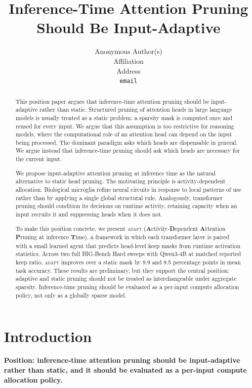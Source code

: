 \documentclass{article}
\title{Inference-Time Attention Pruning Should Be Input-Adaptive}
\author{%
  Anonymous Author(s) \\
  Affiliation \\
  Address \\
  \texttt{email} \\
}
\newcommand{\method}{\textsc{adapt}}
\begin{document}
\maketitle

\begin{abstract}
This position paper argues that inference-time attention pruning should be
input-adaptive rather than static.
Structured pruning of attention heads in large language models is usually
treated as a static problem: a sparsity mask is computed once and reused for
every input. We argue that this assumption is too restrictive for reasoning
models, where the computational role of an attention head can depend on the
input being processed. The dominant paradigm asks which heads are dispensable
in general. We argue instead that inference-time pruning should ask which heads
are necessary for the current input.

We propose input-adaptive attention pruning at inference time as the natural
alternative to static head pruning. The motivating principle is
activity-dependent allocation. Biological microglia refine neural circuits in
response to local patterns of use rather than by applying a single global
structural rule. Analogously, transformer pruning should condition its decisions
on runtime activity, retaining capacity when an input recruits it and suppressing
heads when it does not.

To make this position concrete, we present \method{}
(\textbf{A}ctivity-\textbf{D}ependent \textbf{A}ttention \textbf{P}runing at
inference \textbf{T}ime), a framework in which each transformer layer is paired
with a small learned agent that predicts head-level keep masks from runtime
activation statistics. Across two full BIG-Bench Hard sweeps with Qwen3-4B at
matched reported keep ratio, \method{} improves over a static mask by 9.9 and
9.5 percentage points in mean task accuracy. These results are preliminary, but
they support the central position: adaptive and static pruning should not be
treated as interchangeable under aggregate sparsity. Inference-time pruning
should be evaluated as a per-input compute allocation policy, not only as a
globally sparse model.
\end{abstract}

\section{Introduction}

\textbf{Position: inference-time attention pruning should be input-adaptive
rather than static, and it should be evaluated as a per-input compute
allocation policy.}
\end{document}

